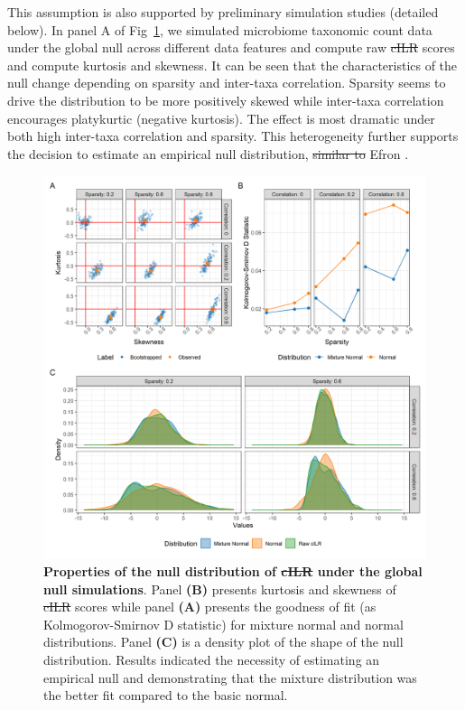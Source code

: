 \documentclass[10pt,letterpaper]{article}
\providecommand{\DIFaddtex}[1]{{\protect\color{blue}\uwave{#1}}} %
\providecommand{\DIFdeltex}[1]{{\protect\color{red}\sout{#1}}}                      %
\providecommand{\DIFaddbegin}{} %
\providecommand{\DIFaddend}{} %
\providecommand{\DIFdelbegin}{} %
\providecommand{\DIFdelend}{} %
\providecommand{\DIFaddFL}[1]{\DIFadd{#1}} %
\providecommand{\DIFdelFL}[1]{\DIFdel{#1}} %
\providecommand{\DIFaddbeginFL}{} %
\providecommand{\DIFaddendFL}{} %
\providecommand{\DIFdelbeginFL}{} %
\providecommand{\DIFdelendFL}{} %
\providecommand{\DIFadd}[1]{\texorpdfstring{\DIFaddtex{#1}}{#1}} %
\providecommand{\DIFdel}[1]{\texorpdfstring{\DIFdeltex{#1}}{}} %
\newcommand{\DIFscaledelfig}{0.5}
\newlength{\DIFdelgraphicswidth} %
\newlength{\DIFdelgraphicsheight} %
\newcommand{\DIFaddincludegraphics}[2][]{{\color{blue}\fbox{\DIFOincludegraphics[#1]{#2}}}} %
\newcommand{\DIFdelincludegraphics}[2][]{%
\sbox{\DIFdelgraphicsbox}{\DIFOincludegraphics[#1]{#2}}%
\settoboxwidth{\DIFdelgraphicswidth}{\DIFdelgraphicsbox} %
\settoboxtotalheight{\DIFdelgraphicsheight}{\DIFdelgraphicsbox} %
\scalebox{\DIFscaledelfig}{%
\parbox[b]{\DIFdelgraphicswidth}{\usebox{\DIFdelgraphicsbox}\\[-\baselineskip] \rule{\DIFdelgraphicswidth}{0em}}\llap{\resizebox{\DIFdelgraphicswidth}{\DIFdelgraphicsheight}{%
\setlength{\unitlength}{\DIFdelgraphicswidth}%
\begin{picture}(1,1)%
\thicklines\linethickness{2pt} %
{\color[rgb]{1,0,0}\put(0,0){\framebox(1,1){}}}%
{\color[rgb]{1,0,0}\put(0,0){\line( 1,1){1}}}%
{\color[rgb]{1,0,0}\put(0,1){\line(1,-1){1}}}%
\end{picture}%
}\hspace*{3pt}}} %
} %
\DeclareRobustCommand{\DIFaddbegin}{\DIFOaddbegin \let\includegraphics\DIFaddincludegraphics} %
\DeclareRobustCommand{\DIFaddend}{\DIFOaddend \let\includegraphics\DIFOincludegraphics} %
\DeclareRobustCommand{\DIFdelbegin}{\DIFOdelbegin \let\includegraphics\DIFdelincludegraphics} %
\DeclareRobustCommand{\DIFdelend}{\DIFOaddend \let\includegraphics\DIFOincludegraphics} %
\DeclareRobustCommand{\DIFaddbeginFL}{\DIFOaddbeginFL \let\includegraphics\DIFaddincludegraphics} %
\DeclareRobustCommand{\DIFaddendFL}{\DIFOaddendFL \let\includegraphics\DIFOincludegraphics} %
\DeclareRobustCommand{\DIFdelbeginFL}{\DIFOdelbeginFL \let\includegraphics\DIFdelincludegraphics} %
\DeclareRobustCommand{\DIFdelendFL}{\DIFOaddendFL \let\includegraphics\DIFOincludegraphics} %
\begin{document}
This assumption is also supported by preliminary simulation studies (detailed below). In panel A of Fig~\ref{fig:1}, we simulated microbiome taxonomic count data under the global null across different data features and compute raw \DIFdelbegin \DIFdel{cILR }\DIFdelend \DIFaddbegin \DIFadd{CBEA }\DIFaddend scores and compute kurtosis and skewness. It can be seen that the characteristics of the null change depending on sparsity and inter-taxa correlation. Sparsity seems to drive the distribution to be more positively skewed while inter-taxa correlation encourages platykurtic (negative kurtosis). The effect is most dramatic under both high inter-taxa correlation and sparsity. This heterogeneity further supports the decision to estimate an empirical null distribution, \DIFdelbegin \DIFdel{similar to }\DIFdelend \DIFaddbegin \DIFadd{as suggested by }\DIFaddend Efron \cite{efron2004}. 

\begin{figure} [!h]
    \centering
    \includegraphics[width=\linewidth]{figures/kurtosis_skewness_gof.png}
    \caption{{\bf Properties of the null distribution of \DIFdelbeginFL \DIFdelFL{cILR }\DIFdelendFL \DIFaddbeginFL \DIFaddFL{CBEA }\DIFaddendFL under the global null simulations}. Panel \textbf{(B)} presents kurtosis and skewness of \DIFdelbeginFL \DIFdelFL{cILR }\DIFdelendFL \DIFaddbeginFL \DIFaddFL{CBEA }\DIFaddendFL scores while panel \textbf{(A)} presents the goodness of fit (as Kolmogorov-Smirnov D statistic) for mixture normal and normal distributions. Panel \textbf{(C)} is a density plot of the shape of the null distribution. Results indicated the necessity of estimating an empirical null and demonstrating that the mixture distribution was the better fit compared to the basic normal.}
    \label{fig:1}
\end{figure}
\end{document}
